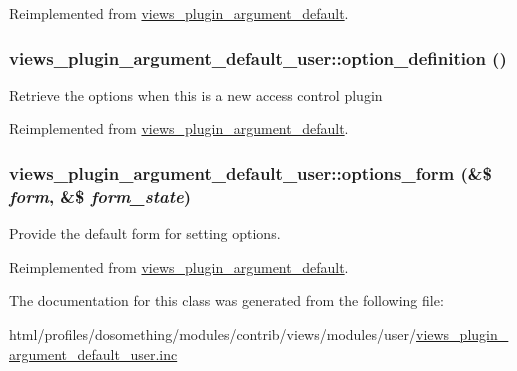 Reimplemented from \hyperlink{classviews__plugin__argument__default_a8e67864f4a1ce20b12bc82afe1acd255}{views\_\-plugin\_\-argument\_\-default}.\hypertarget{classviews__plugin__argument__default__user_a7658c2ea175f9a2bf4c48e6e4a34fea8}{
\subsubsection[{option\_\-definition}]{\setlength{\rightskip}{0pt plus 5cm}views\_\-plugin\_\-argument\_\-default\_\-user::option\_\-definition ()}}
\label{classviews__plugin__argument__default__user_a7658c2ea175f9a2bf4c48e6e4a34fea8}
Retrieve the options when this is a new access control plugin 

Reimplemented from \hyperlink{classviews__plugin__argument__default_ac3a58218880857bc009d4617fab2241b}{views\_\-plugin\_\-argument\_\-default}.\hypertarget{classviews__plugin__argument__default__user_aa034a957fc75daf289368c429a26e10e}{
\subsubsection[{options\_\-form}]{\setlength{\rightskip}{0pt plus 5cm}views\_\-plugin\_\-argument\_\-default\_\-user::options\_\-form (\&\$ {\em form}, \/  \&\$ {\em form\_\-state})}}
\label{classviews__plugin__argument__default__user_aa034a957fc75daf289368c429a26e10e}
Provide the default form for setting options. 

Reimplemented from \hyperlink{classviews__plugin__argument__default_a9bc59dae448f4c35d422bc54d0879930}{views\_\-plugin\_\-argument\_\-default}.

The documentation for this class was generated from the following file:\begin{DoxyCompactItemize}
\item 
html/profiles/dosomething/modules/contrib/views/modules/user/\hyperlink{views__plugin__argument__default__user_8inc}{views\_\-plugin\_\-argument\_\-default\_\-user.inc}\end{DoxyCompactItemize}
